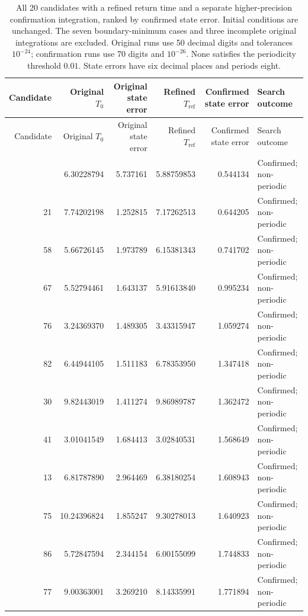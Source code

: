 \begin{landscape}
\begingroup
\small
\setlength{\tabcolsep}{4pt}
\begin{longtable}{rrrrrl}
\caption{All 20 candidates with a refined return time and a separate higher-precision confirmation integration, ranked by confirmed state error. Initial conditions are unchanged. The seven boundary-minimum cases and three incomplete original integrations are excluded. Original runs use 50 decimal digits and tolerances $10^{-24}$; confirmation runs use 70 digits and $10^{-26}$. None satisfies the periodicity threshold $0.01$. State errors have six decimal places and periods eight.}
\label{tab:best-candidates}\\
\toprule
Candidate & Original $T_0$ & Original state error & Refined $T_{\mathrm{ref}}$ & Confirmed state error & Search outcome \\
\midrule
\endfirsthead
\toprule
Candidate & Original $T_0$ & Original state error & Refined $T_{\mathrm{ref}}$ & Confirmed state error & Search outcome \\
\midrule
\endhead
\bottomrule
\endfoot
59 & 6.30228794 & 5.737161 & 5.88759853 & 0.544134 & Confirmed; non-periodic \\
21 & 7.74202198 & 1.252815 & 7.17262513 & 0.644205 & Confirmed; non-periodic \\
58 & 5.66726145 & 1.973789 & 6.15381343 & 0.741702 & Confirmed; non-periodic \\
67 & 5.52794461 & 1.643137 & 5.91613840 & 0.995234 & Confirmed; non-periodic \\
76 & 3.24369370 & 1.489305 & 3.43315947 & 1.059274 & Confirmed; non-periodic \\
82 & 6.44944105 & 1.511183 & 6.78353950 & 1.347418 & Confirmed; non-periodic \\
30 & 9.82443019 & 1.411274 & 9.86989787 & 1.362472 & Confirmed; non-periodic \\
41 & 3.01041549 & 1.684413 & 3.02840531 & 1.568649 & Confirmed; non-periodic \\
13 & 6.81787890 & 2.964469 & 6.38180254 & 1.608943 & Confirmed; non-periodic \\
75 & 10.24396824 & 1.855247 & 9.30278013 & 1.640923 & Confirmed; non-periodic \\
86 & 5.72847594 & 2.344154 & 6.00155099 & 1.744833 & Confirmed; non-periodic \\
77 & 9.00363001 & 3.269210 & 8.14335991 & 1.771894 & Confirmed; non-periodic \\

\end{longtable}
\end{landscape}
